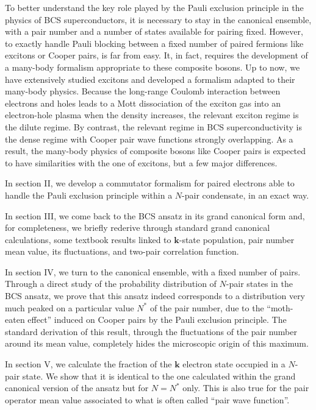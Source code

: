 \documentclass[twocolumn,showpacs]{revtex4}
\def\v#1{\mathbf{#1}}
\begin{document}
To better understand the key role played by the Pauli exclusion principle in the physics of BCS superconductors, it is necessary to stay in the canonical ensemble, with a pair number and a number of states available for pairing fixed. However, to exactly handle Pauli blocking between a fixed number of paired fermions like excitons or Cooper pairs, is far from easy. It, in fact, requires the development of a many-body formalism appropriate to these composite bosons. Up to now, we have extensively studied excitons and developed a formalism adapted to their many-body physics. Because the long-range Coulomb interaction between electrons and holes leads to a Mott dissociation of the exciton gas  into an electron-hole plasma when the density increases, the relevant exciton regime is the dilute regime. By contrast, the relevant regime in BCS superconductivity is the dense regime with Cooper pair wave functions strongly overlapping. As a result, the many-body physics of composite bosons like Cooper pairs is expected to have similarities with the one of excitons, but a few major differences.

In section II, we  develop a commutator formalism for paired electrons able to handle the Pauli exclusion principle within a $N$-pair condensate, in an exact way.

In section III, we come back to the BCS ansatz in its grand canonical form and, for completeness, we briefly rederive through standard grand canonical calculations, some textbook results linked to $\v k$-state population, pair number mean value, its fluctuations, and two-pair correlation function.

In section IV, we turn to the canonical ensemble, with a fixed number of pairs. Through a direct study of the probability distribution of $N$-pair states in the BCS ansatz,  we prove that this ansatz indeed corresponds to a distribution very much peaked on a particular value $N^\ast$ of the pair number, due to the ``moth-eaten effect'' induced on Cooper pairs by the Pauli exclusion principle. The standard derivation of this result, through the fluctuations of the pair number around its mean value, completely hides the microscopic origin of this maximum.

In section V, we calculate the fraction of the $\v k$ electron state occupied in a $N$-pair state. We show that it is identical to the one calculated within the grand canonical version of the ansatz but for $N=N^\ast$ only. This is also true for the pair operator mean value associated to what is often called ``pair wave function''.
\end{document}
